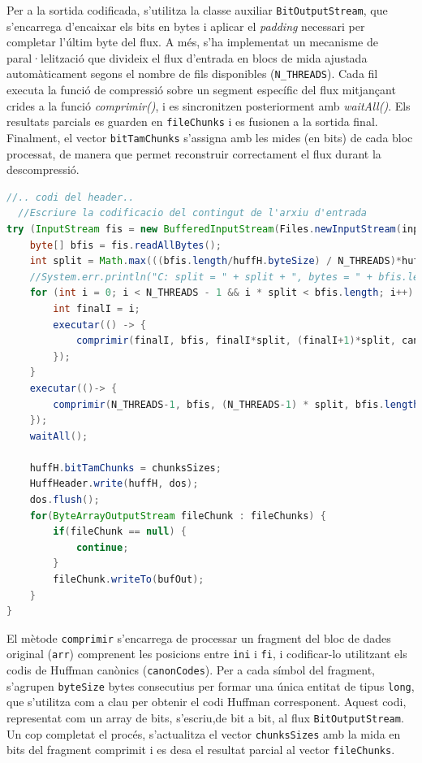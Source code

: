 \documentclass{ieeetj}
\begin{document}
Per a la sortida codificada, s’utilitza la classe auxiliar \texttt{BitOutputStream}, que s’encarrega d’encaixar els bits en bytes i aplicar el \textit{padding} necessari per completar l’últim byte del flux. \newline
A més, s'ha implementat un mecanisme de paral·lelització que divideix el flux d’entrada en blocs de mida ajustada automàticament segons el nombre de fils disponibles (\texttt{N\_THREADS}). Cada fil executa la funció de compressió sobre un segment específic del flux mitjançant crides a la funció \textit{comprimir()}, i es sincronitzen posteriorment amb \textit{waitAll()}. Els resultats parcials es guarden en \texttt{fileChunks} i es fusionen a la sortida final. Finalment, el vector \texttt{bitTamChunks} s’assigna amb les mides (en bits) de cada bloc processat, de manera que permet reconstruir correctament el flux durant la descompressió.
\begin{lstlisting}[language = Java, breaklines = true]
    //.. codi del header..
  //Escriure la codificacio del contingut de l'arxiu d'entrada
try (InputStream fis = new BufferedInputStream(Files.newInputStream(inputPath))) {
    byte[] bfis = fis.readAllBytes();
    int split = Math.max(((bfis.length/huffH.byteSize) / N_THREADS)*huffH.byteSize, 256);
    //System.err.println("C: split = " + split + ", bytes = " + bfis.length + ", " + (split*N_THREADS));
    for (int i = 0; i < N_THREADS - 1 && i * split < bfis.length; i++) {
        int finalI = i;
        executar(() -> {
            comprimir(finalI, bfis, finalI*split, (finalI+1)*split, canonCodes, huffH.byteSize);
        });
    }
    executar(()-> {
        comprimir(N_THREADS-1, bfis, (N_THREADS-1) * split, bfis.length, canonCodes, huffH.byteSize);
    });
    waitAll();

    huffH.bitTamChunks = chunksSizes;
    HuffHeader.write(huffH, dos);
    dos.flush();
    for(ByteArrayOutputStream fileChunk : fileChunks) {
        if(fileChunk == null) {
            continue;
        }
        fileChunk.writeTo(bufOut);
    }
}    
\end{lstlisting}

El mètode \texttt{comprimir} s’encarrega de processar un fragment del bloc de dades original (\texttt{arr}) comprenent les posicions entre \texttt{ini} i \texttt{fi}, i codificar-lo utilitzant els codis de Huffman canònics (\texttt{canonCodes}). Per a cada símbol del fragment, s’agrupen \texttt{byteSize} bytes consecutius per formar una única entitat de tipus \texttt{long}, que s’utilitza com a clau per obtenir el codi Huffman corresponent. Aquest codi, representat com un array de bits, s’escriu,de bit a bit, al flux \texttt{BitOutputStream}. Un cop completat el procés, s’actualitza el vector \texttt{chunksSizes} amb la mida en bits del fragment comprimit i es desa el resultat parcial al vector \texttt{fileChunks}.
\end{document}

